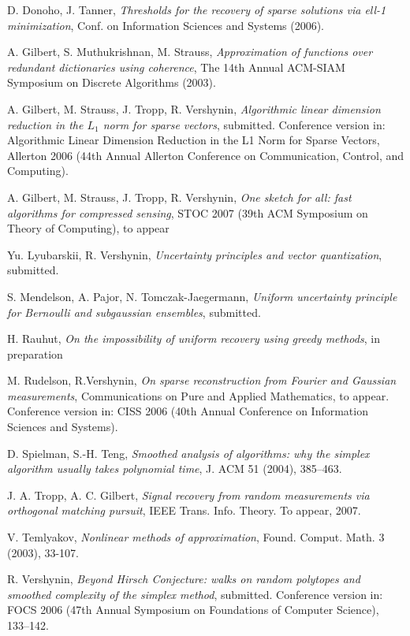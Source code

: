 \documentclass[12pt]{amsart}
\theoremstyle{plain}
\theoremstyle{definition}
\theoremstyle{remark}
\numberwithin{equation}{section}
\begin{document}
{\begin{thebibliography}{S 99}
     D. Donoho, J. Tanner,
  {\em Thresholds for the recovery of sparse solutions via ell-1 minimization}, Conf. on Information Sciences and Systems (2006).
  
 A. Gilbert, S. Muthukrishnan, M. Strauss,
	{\em Approximation of functions over redundant dictionaries using coherence},
	The 14th Annual ACM-SIAM Symposium on Discrete Algorithms (2003).

 A. Gilbert, M. Strauss, J. Tropp, R. Vershynin, 
  {\em Algorithmic linear dimension reduction in the $L_1$ norm for sparse vectors}, 
  submitted. 
  Conference version in: 
  Algorithmic Linear Dimension Reduction in the L1 Norm for Sparse Vectors, Allerton 2006 
  (44th Annual Allerton Conference on Communication, Control, and Computing).

 A. Gilbert, M. Strauss, J. Tropp, R. Vershynin, 
{\em One sketch for all: fast algorithms for compressed sensing}, 
STOC 2007 (39th ACM Symposium on Theory of Computing), to appear

 Yu. Lyubarskii, R. Vershynin, 
  {\em Uncertainty principles and vector quantization}, 
  submitted.

 S. Mendelson, A. Pajor, N. Tomczak-Jaegermann, 
  {\em Uniform uncertainty principle for Bernoulli and subgaussian ensembles},
  submitted.

 H. Rauhut, 
  {\em On the impossibility of uniform recovery using greedy methods},
  in preparation

 M. Rudelson, R.Vershynin, 
  {\em On sparse reconstruction from Fourier and Gaussian measurements}, 
  Communications on Pure and Applied Mathematics, to appear. 
  Conference version in: CISS 2006 
  (40th Annual Conference on Information Sciences and Systems).

 D. Spielman, S.-H. Teng,
  {\em Smoothed analysis of algorithms: why the simplex algorithm usually takes 
  polynomial time},  
  J. ACM  51  (2004), 385--463.

 J. A. Tropp, A. C. Gilbert, 
  {\em Signal recovery from random measurements via orthogonal matching pursuit},
  IEEE Trans. Info. Theory. To appear, 2007.

 V. Temlyakov, {\em Nonlinear methods of approximation}, Found. Comput. Math. 3 (2003), 33-107.

 R. Vershynin, 
  {\em Beyond Hirsch Conjecture: walks on random polytopes and smoothed 
  complexity of the simplex method}, submitted. 
  Conference version in:
  FOCS 2006 (47th Annual Symposium on Foundations of Computer Science), 133--142.

\end{thebibliography}
}
\end{document}

